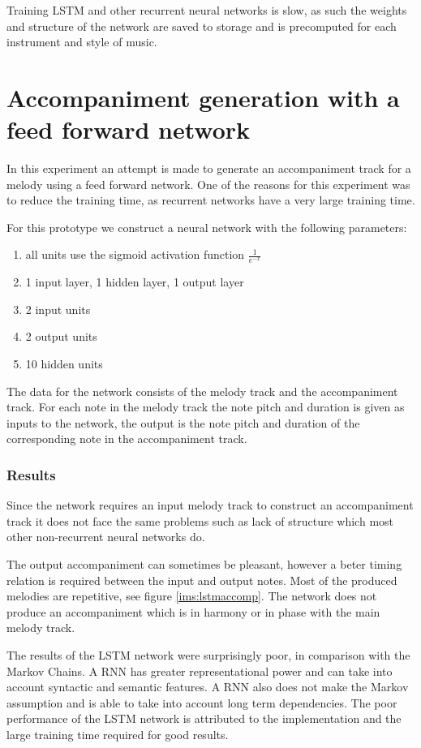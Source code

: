 Training LSTM and other recurrent neural networks is slow, as such the weights and structure of the network are saved to storage and is precomputed for each instrument and style of music.

\chapter{Accompaniment generation with a feed forward network}
In this experiment an attempt is made to generate an accompaniment track for a melody using a feed forward network. One of the reasons for this experiment was to reduce the training time, as recurrent networks have a very large training time.

For this prototype we construct a neural network with the following parameters:
\begin{enumerate}
\item all units use the sigmoid activation function $\frac{1}{e^{-x}}$
\item 1 input layer, 1 hidden layer, 1 output layer
\item 2 input units
\item 2 output units
\item 10 hidden units
\end{enumerate}

The data for the network consists of the melody track and the accompaniment track. For each note in the melody track the note pitch and duration is given as inputs to the network, the output is the note pitch and duration of the corresponding note in the accompaniment track.

\subsection{Results}
Since the network requires an input melody track to construct an accompaniment track it does not face the same problems such as lack of structure which most other non-recurrent neural networks do.

The output accompaniment can sometimes be pleasant, however a beter timing relation is required between the input and output notes. Most of the produced melodies are repetitive, see figure \ref{ims:lstmaccomp}. The network does not produce an accompaniment which is in harmony or in phase with the main melody track.

The results of the \ac{LSTM} network were surprisingly poor, in comparison with the Markov Chains. A \ac{RNN} has greater representational power and can take into account syntactic and semantic features. A \ac{RNN} also does not make the Markov assumption and is able to take into account long term dependencies. The poor performance of the \ac{LSTM} network is attributed to the implementation and the large training time required for good results.


